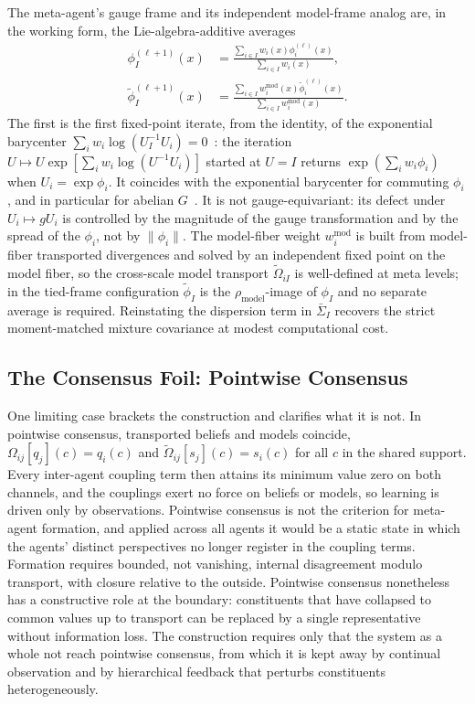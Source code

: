The meta-agent's gauge frame and its independent model-frame analog are, in the working form, the Lie-algebra-additive averages
\begin{equation}
\begin{aligned}
\phi_I^{(\ell+1)}(x)
&= \frac{\sum_{i \in I} w_i(x)\phi_i^{(\ell)}(x)}{\sum_{i \in I} w_i(x)}, \\
\tilde\phi_I^{(\ell+1)}(x)
&= \frac{\sum_{i \in I} w_i^{\mathrm{mod}}(x)\tilde\phi_i^{(\ell)}(x)}{\sum_{i \in I} w_i^{\mathrm{mod}}(x)}.
\end{aligned}
\end{equation}
The first is the first fixed-point iterate, from the identity, of the exponential barycenter $\sum_i w_i\log(U_I^{-1}U_i) = 0$~\cite{PennecArsigny2013}: the iteration $U \mapsto U\exp[\sum_i w_i \log(U^{-1}U_i)]$ started at $U = I$ returns $\exp(\sum_i w_i \phi_i)$ when $U_i = \exp\phi_i$. It coincides with the exponential barycenter for commuting $\phi_i$, and in particular for abelian $G$~\cite{Hall2015}. It is not gauge-equivariant: its defect under $U_i \mapsto gU_i$ is controlled by the magnitude of the gauge transformation and by the spread of the $\phi_i$, not by $\|\phi_i\|$. The model-fiber weight $w^{\mathrm{mod}}_i$ is built from model-fiber transported divergences and solved by an independent fixed point on the model fiber, so the cross-scale model transport $\tilde\Omega_{iI}$ is well-defined at meta levels; in the tied-frame configuration $\tilde\phi_I$ is the $\rho_{\mathrm{model}}$-image of $\phi_I$ and no separate average is required. Reinstating the dispersion term in $\bar{\Sigma}_I$ recovers the strict moment-matched mixture covariance at modest computational cost.

\subsection{The Consensus Foil: Pointwise Consensus}
\label{sec:epistemic_collapse}

One limiting case brackets the construction and clarifies what it is not. In pointwise consensus, transported beliefs and models coincide, $\Omega_{ij}[q_j](c) = q_i(c)$ and $\tilde{\Omega}_{ij}[s_j](c) = s_i(c)$ for all $c$ in the shared support. Every inter-agent coupling term then attains its minimum value zero on both channels, and the couplings exert no force on beliefs or models, so learning is driven only by observations. Pointwise consensus is not the criterion for meta-agent formation, and applied across all agents it would be a static state in which the agents' distinct perspectives no longer register in the coupling terms. Formation requires bounded, not vanishing, internal disagreement modulo transport, with closure relative to the outside. Pointwise consensus nonetheless has a constructive role at the boundary: constituents that have collapsed to common values up to transport can be replaced by a single representative without information loss. The construction requires only that the system as a whole not reach pointwise consensus, from which it is kept away by continual observation and by hierarchical feedback that perturbs constituents heterogeneously.

